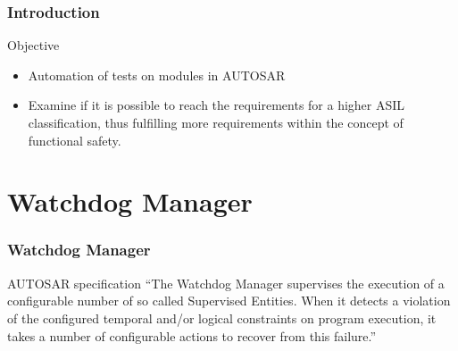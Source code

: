 \documentclass{beamer}
\begin{document}

\begin{frame}[fragile]
  \frametitle{Introduction}
  \begin{block}{Objective}
    \begin{itemize}
        \item Automation of tests on modules in AUTOSAR
        \item Examine if it is possible to reach the requirements for
          a higher ASIL classification, thus fulfilling more
          requirements within the concept of functional safety.
    \end{itemize}
   \end{block}
\end{frame}


\section{Watchdog Manager}

\begin{frame}
  \frametitle{Watchdog Manager}
  \begin{block}{AUTOSAR specification}
    ``The Watchdog Manager supervises the execution of a configurable
    number of so called Supervised Entities. When it detects a violation
    of the configured temporal and/or logical constraints on program
    execution, it takes a number of configurable actions to recover from
    this failure.''
  \end{block}
\end{frame}

\end{document}
